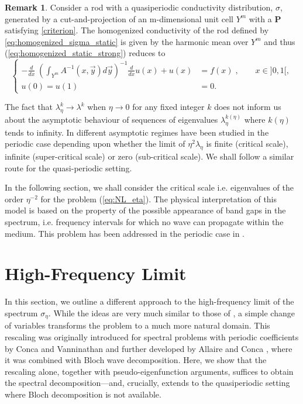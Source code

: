 \documentclass[a4paper,reqno]{amsart}
\numberwithin{equation}{section}
\numberwithin{equation}{section}		%
\numberwithin{figure}{section}			%
\numberwithin{table}{section}				%
\theoremstyle{definition}
\newtheorem{remark}[theorem]{Remark}
\newcommand{\<}{\ensuremath \leq}
\renewcommand{\>}{\ensuremath \geq}
\def\e{\eta}
\begin{document}
\begin{remark}
Consider a rod with a quasiperiodic conductivity distribution, $\sigma$, generated by a cut-and-projection of an m-dimensional unit cell $Y^m$ with a $\textbf{P}$ satisfying \eqref{criterion}. The homogenized conductivity of the rod defined by  \eqref{eq:homogenized_sigma_static} is given by  the harmonic mean over $Y^m$ and thus (\ref{eq:homogenized_static_strong}) reduces to
\begin{equation}  \label{eq:GREEN1D_0}
     \left\{
        \begin{aligned}
   -  \frac{d}{dx} \;  {{\left(\int_{Y^m}
A^{-1}(x,\vec{y})d\vec{y}\right)}^{-1}}  \frac{d}{dx}  u(x)  + u(x)
& =    f(x)  \;, \qquad x \in ]0,1[,\\
            u(0)=u(1) & = 0.
        \end{aligned}
        \right.
\end{equation}
\end{remark}


The fact that $\lambda_\eta^k\to\lambda^k$ when $\e\to 0$ for any fixed integer $k$ does not inform us about the asymptotic behaviour of sequences of eigenvalues $\lambda_\eta^{k(\e)}$ where $k(\e)$ tends to infinity. In \cite{allaire1998bloch} different asymptotic regimes have been studied in the periodic case depending upon whether the limit of $\e^{2}\lambda_\e$ is finite (critical scale), infinite (super-critical scale) or zero (sub-critical scale). We shall follow a similar route for the quasi-periodic setting.  

In the following section, we shall consider the critical scale i.e. eigenvalues of the order $\eta^{-2}$ for the problem (\ref{eq:NL_eta}). The physical interpretation of this model is based on the property of the possible appearance of band gaps in the spectrum, i.e. frequency intervals for which no wave can propagate within the medium. This problem has been addressed in the periodic case in \cite{allaire1998bloch}. 

\section{High-Frequency Limit}
In this section, we outline a different approach to the high-frequency limit of the spectrum $\sigma_\eta$. While the ideas are very much similar to those of \cite{allaire1998bloch}, a simple change of variables transforms the problem to a much more natural domain. This rescaling was originally introduced for spectral problems with periodic coefficients by Conca  and Vanninathan \cite{concaSpectral1988}
and further developed by Allaire and Conca \cite{allaire1998boundary}, where it was combined with Bloch wave decomposition. Here, we show that the rescaling alone, together with pseudo-eigenfunction arguments, suffices to obtain the spectral decomposition---and, crucially, extends to the quasiperiodic setting where Bloch decomposition is not available.
\end{document}
